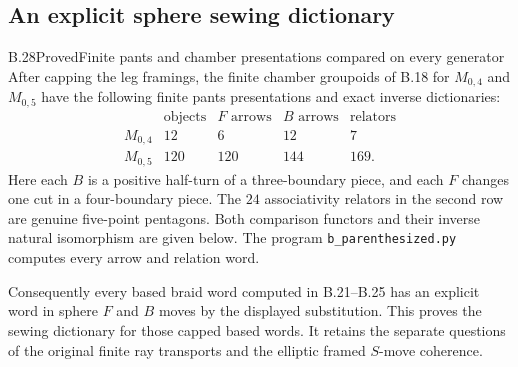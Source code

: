 
\subsection{An explicit sphere sewing dictionary}

\begin{result}{B.28}{Proved}{Finite pants and chamber presentations compared on every generator}
After capping the leg framings, the finite chamber groupoids
of B.18 for $M_{0,4}$ and $M_{0,5}$ have the following
finite pants presentations and exact inverse dictionaries:
\[
\begin{array}{c|r|r|r|r}
 &\text{objects}&F\text{ arrows}&B\text{ arrows}&\text{relators}\\ \hline
 M_{0,4}&12&6&12&7\\
 M_{0,5}&120&120&144&169 .
\end{array}                                                     \tag{B.83}
\]
Here each $B$ is a positive half-turn of a three-boundary
piece, and each $F$ changes one cut in a four-boundary
piece.  The $24$ associativity relators in the second
row are genuine five-point pentagons.  Both comparison
functors and their inverse natural isomorphism are
given below.  The program \texttt{b\_parenthesized.py}
computes every arrow and relation word.

Consequently every based braid word computed in B.21--B.25
has an explicit word in sphere $F$ and $B$ moves by the
displayed substitution.  This proves the sewing dictionary
for those capped based words.  It retains the separate
questions of the original finite ray transports and the
elliptic framed $S$-move coherence.
\end{result}
